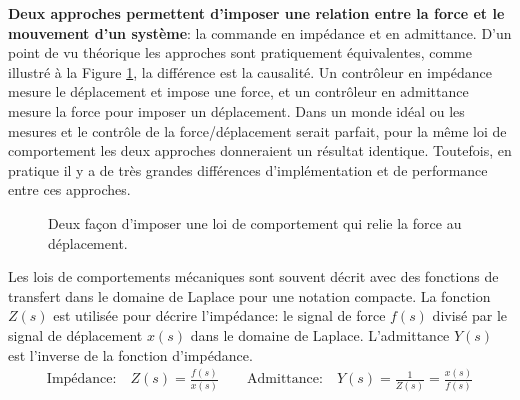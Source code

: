 \textbf{Deux approches permettent d'imposer une relation entre la force et le mouvement d'un système}: la commande en impédance et en admittance. D'un point de vu théorique les approches sont pratiquement équivalentes, comme illustré à la Figure \ref{fig:impedanceadmitancecontrolbloc}, la différence est la causalité. Un contrôleur en impédance mesure le déplacement et impose une force, et un contrôleur en admittance mesure la force pour imposer un déplacement. Dans un monde idéal ou les mesures et le contrôle de la force/déplacement serait parfait, pour la même loi de comportement les deux approches donneraient un résultat identique. Toutefois, en pratique il y a de très grandes différences d'implémentation et de performance entre ces approches. 
\begin{figure}[H]
        \centering
				\hspace{30pt}
        \caption{Deux façon d'imposer une loi de comportement qui relie la force au déplacement.}
				\label{fig:impedanceadmitancecontrolbloc}
\end{figure}

Les lois de comportements mécaniques sont souvent décrit avec des fonctions de transfert dans le domaine de Laplace pour une notation compacte. La fonction $Z(s)$ est utilisée pour décrire l'impédance: le signal de force $f(s)$ divisé par le signal de déplacement $x(s)$ dans le domaine de Laplace. L'admittance $Y(s)$ est l'inverse de la fonction d'impédance. 
\begin{align}
\text{Impédance:} \quad Z(s) = \frac{f(s)}{x(s)} \quad\quad \text{Admittance:} \quad Y(s) =  \frac{1}{Z(s)} = \frac{x(s)}{f(s)}
\end{align}

